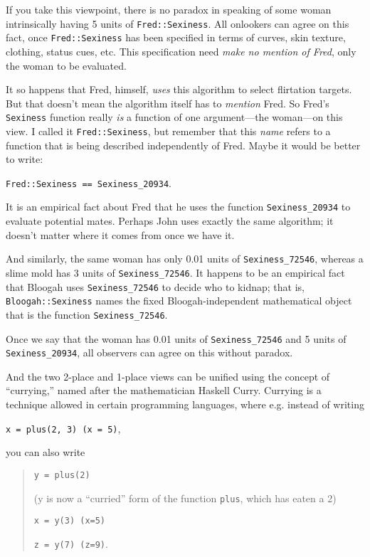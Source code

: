 {
 If you take this viewpoint, there is no paradox in speaking of
some woman intrinsically having 5 units of \texttt{Fred::Sexiness}. All
onlookers can agree on this fact, once \texttt{Fred::Sexiness} has been
specified in terms of curves, skin texture, clothing, status cues, etc.
This specification need \textit{make no mention of Fred}, only the
woman to be evaluated.}

{
 It so happens that Fred, himself, \textit{uses} this algorithm to
select flirtation targets. But that doesn't mean the
algorithm itself has to \textit{mention} Fred. So
Fred's \texttt{Sexiness} function really \textit{is} a function
of one argument---the woman---on this view. I called it \texttt{Fred::Sexiness},
but remember that this \textit{name} refers to a function that is being
described independently of Fred. Maybe it would be better to write:}

\begin{center}
\texttt{Fred::Sexiness == Sexiness\_20934}.
\end{center}

{
 It is an empirical fact about Fred that he uses the function
\texttt{Sexiness\_20934} to evaluate potential mates. Perhaps John uses exactly
the same algorithm; it doesn't matter where it comes
from once we have it.}

{
 And similarly, the same woman has only 0.01 units of
\texttt{Sexiness\_72546}, whereas a slime mold has 3 units of \texttt{Sexiness\_72546}.
It happens to be an empirical fact that Bloogah uses \texttt{Sexiness\_72546} to
decide who to kidnap; that is, \texttt{Bloogah::Sexiness} names the fixed
Bloogah-independent mathematical object that is the function
\texttt{Sexiness\_72546}.}

{
 Once we say that the woman has 0.01 units of \texttt{Sexiness\_72546} and 5
units of \texttt{Sexiness\_20934}, all observers can agree on this without
paradox.}

{
 And the two 2-place and 1-place views can be unified using the
concept of ``currying,'' named after
the mathematician Haskell Curry. Currying is a technique allowed in
certain programming languages, where e.g. instead of writing}

\begin{center}
\texttt{x = plus(2, 3) (x = 5)},
\end{center}


{
 you can also write}

\begin{quotation}
\texttt{y = plus(2)}

 (y is now a ``curried'' form of
the function \texttt{plus}, which has eaten a 2)

 \texttt{x = y(3) (x=5)}

 \texttt{z = y(7) (z=9)}.
\end{quotation}

